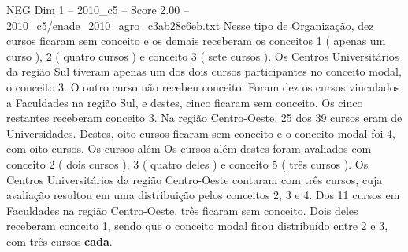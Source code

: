 \begin{textsample}{NEG Dim 1 – 2010\_c5 – Score 2.00 – 2010\_c5/enade\_2010\_agro\_c3ab28c6eb.txt}
Nesse tipo de Organização, dez cursos ficaram sem conceito e os demais receberam os conceitos 1 ( apenas um curso ), 2 ( quatro cursos ) e conceito 3 ( sete cursos ).
Os Centros Universitários da região Sul tiveram apenas um dos dois cursos participantes no conceito modal, o conceito 3.
O outro curso não recebeu conceito.
Foram dez os cursos vinculados a Faculdades na região Sul, e destes, cinco ficaram sem conceito.
Os cinco restantes receberam conceito 3.
Na região Centro-Oeste, 25 dos 39 cursos eram de Universidades.
Destes, oito cursos ficaram sem conceito e o conceito modal foi 4, com oito cursos.
Os cursos além Os cursos além destes foram avaliados com conceito 2 ( dois cursos ), 3 ( quatro deles ) e conceito 5 ( três cursos ).
Os Centros Universitários da região Centro-Oeste contaram com três cursos, cuja avaliação resultou em uma distribuição pelos conceitos 2, 3 e 4.
Dos 11 cursos em Faculdades na região Centro-Oeste, três ficaram sem conceito.
Dois deles receberam conceito 1, sendo que o conceito modal ficou distribuído entre 2 e 3, com três cursos \textbf{cada}.

\end{textsample}
